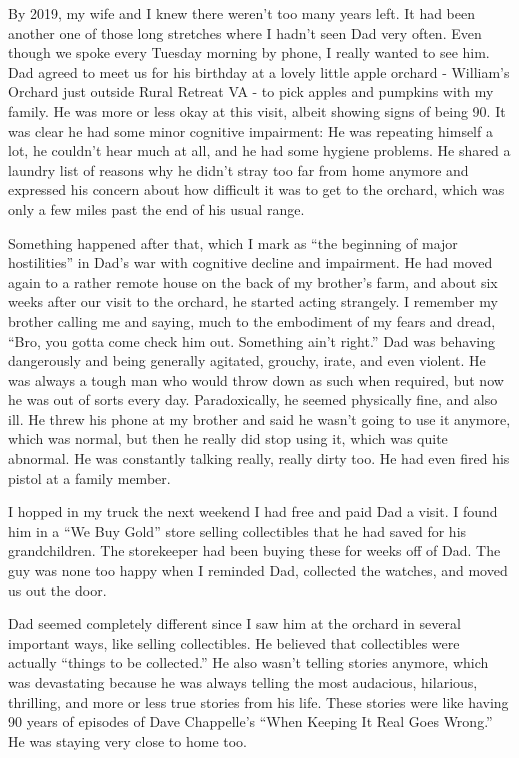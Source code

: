 \documentclass{article}
\begin{document}
By 2019, my wife and I knew there weren't too many years left. It had been another one of those long stretches where I hadn't seen Dad very often. Even though we spoke every Tuesday morning by phone, I really wanted to see him. Dad agreed to meet us for his birthday at a lovely little apple orchard - William's Orchard just outside Rural Retreat VA - to pick apples and pumpkins with my family. He was more or less okay at this visit, albeit showing signs of being 90. It was clear he had some minor cognitive impairment: He was repeating himself a lot, he couldn't hear much at all, and he had some hygiene problems. He shared a laundry list of reasons why he didn't stray too far from home anymore and expressed his concern about how difficult it was to get to the orchard, which was only a few miles past the end of his usual range.

Something happened after that, which I mark as ``the beginning of major hostilities'' in Dad's war with cognitive decline and impairment. He had moved again to a rather remote house on the back of my brother's farm, and about six weeks after our visit to the orchard, he started acting strangely. I remember my brother calling me and saying, much to the embodiment of my fears and dread, ``Bro, you gotta come check him out. Something ain't right.'' Dad was behaving dangerously and being generally agitated, grouchy, irate, and even violent. He was always a tough man who would throw down as such when required, but now he was out of sorts every day. Paradoxically, he seemed physically fine, and also ill. He threw his phone at my brother and said he wasn't going to use it anymore, which was normal, but then he really did stop using it, which was quite abnormal. He was constantly talking really, really dirty too. He had even fired his pistol at a family member.

I hopped in my truck the next weekend I had free and paid Dad a visit. I found him in a ``We Buy Gold'' store selling collectibles that he had saved for his grandchildren. The storekeeper had been buying these for weeks off of Dad. The guy was none too happy when I reminded Dad, collected the watches, and moved us out the door.

Dad seemed completely different since I saw him at the orchard in several important ways, like selling collectibles. He believed that collectibles were actually ``things to be collected.'' He also wasn't telling stories anymore, which was devastating because he was always telling the most audacious, hilarious, thrilling, and more or less true stories from his life. These stories were like having 90 years of episodes of Dave Chappelle's ``When Keeping It Real Goes Wrong.'' He was staying very close to home too.
\end{document}
